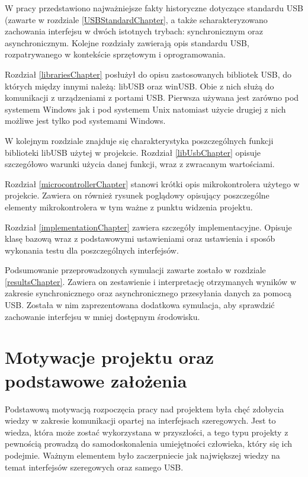 \documentclass{BscUS}
\begin{document}
W pracy przedstawiono najważniejsze fakty historyczne dotyczące standardu USB (zawarte w rozdziale \ref{USBStandardChapter}, a także scharakteryzowano zachowania interfejsu w dwóch istotnych trybach: synchronicznym oraz asynchronicznym. Kolejne rozdziały zawierają opis standardu USB, rozpatrywanego w kontekście sprzętowym i oprogramowania.

Rozdział \ref{librariesChapter} posłużył do opisu zastosowanych bibliotek USB, do których między innymi należą: libUSB oraz winUSB. Obie z nich służą do komunikacji z urządzeniami z portami USB. Pierwsza używana jest zarówno pod systemem Windows jak i pod systemem Unix natomiast użycie drugiej z nich możliwe jest tylko pod systemami Windows.

W kolejnym rozdziale znajduje się charakterystyka poszczególnych funkcji biblioteki libUSB użytej w projekcie. Rozdział \ref{libUsbChapter} opisuje szczegółowo warunki użycia danej funkcji, wraz z zwracanym wartościami. 

Rozdział \ref{microcontrollerChapter} stanowi krótki opis mikrokontrolera użytego w projekcie. Zawiera on również rysunek poglądowy opisujący poszczególne elementy mikrokontrolera w tym ważne z punktu widzenia projektu.

Rozdział \ref{implementationChapter} zawiera szczegóły implementacyjne. Opisuje klasę bazową wraz z podstawowymi ustawieniami oraz ustawienia i sposób wykonania testu dla poszczególnych interfejsów.

Podsumowanie przeprowadzonych symulacji zawarte zostało w rozdziale \ref{resultsChapter}. Zawiera on zestawienie i interpretację otrzymanych wyników w zakresie synchronicznego oraz asynchronicznego przesyłania danych za pomocą USB. Została w nim zaprezentowana dodatkowa symulacja, aby sprawdzić zachowanie interfejsu w mniej dostępnym środowisku.
\fi

\chapter{Motywacje projektu oraz podstawowe założenia}
\label{ch:motivationAndBasics}
Podstawową motywacją rozpoczęcia pracy nad projektem była chęć zdobycia wiedzy w zakresie komunikacji opartej na interfejsach szeregowych. Jest to wiedza, która może zostać wykorzystana w przyszłości, a tego typu projekty z pewnością prowadzą do samodoskonalenia umiejętności człowieka, który się ich podejmie. Ważnym elementem było zaczerpniecie jak największej wiedzy na temat interfejsów szeregowych oraz samego USB.
\end{document}
